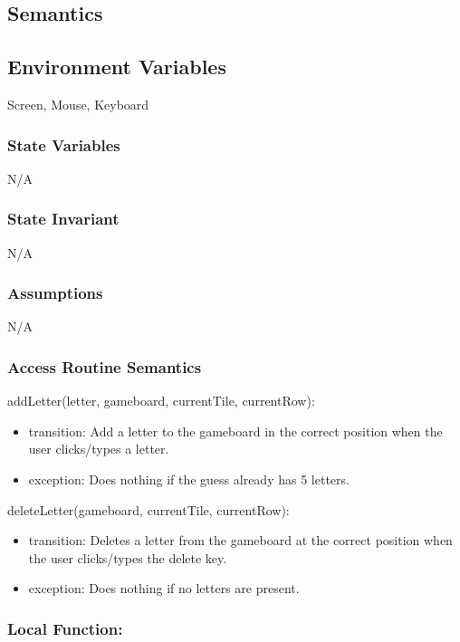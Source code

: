 \documentclass[12pt]{article}
\begin{document}
\subsection* {Semantics}

\subsection*{Environment Variables}

Screen, Mouse, Keyboard

\subsubsection* {State Variables}
N/A

\subsubsection* {State Invariant}

N/A

\subsubsection* {Assumptions}

N/A

\subsubsection* {Access Routine Semantics}

\noindent addLetter(letter, gameboard, currentTile, currentRow):
\begin{itemize}
  \item transition: Add a letter to the gameboard in the correct position when the user clicks/types a letter. 
 \item exception: Does nothing if the guess already has 5 letters.
\end{itemize}

\noindent deleteLetter(gameboard, currentTile, currentRow):
\begin{itemize}
  \item transition: Deletes a letter from the gameboard at the correct position when the user clicks/types the delete key. 
  \item exception: Does nothing if no letters are present.
\end{itemize}

\subsubsection*{Local Function:}
\end{document}
